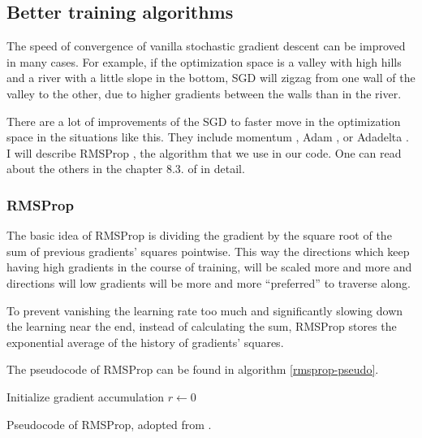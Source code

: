\subsection{Better training algorithms}
The speed of convergence of vanilla stochastic gradient descent can be improved in many cases. For example, if the optimization space is a valley with high hills and a river with a little slope in the bottom, SGD will zigzag from one wall of the valley to the other, due to higher gradients between the walls than in the river. 

There are a lot of improvements of the SGD to faster move in the optimization space in the situations like this. They include momentum \cite{momentum}, Adam \cite{adam}, or Adadelta \cite{adadelta}. I will describe RMSProp \cite{rmsprop}, the algorithm that we use in our code. One can read about the others in the chapter 8.3. of \cite{dlbook} in detail.

\subsubsection{RMSProp}\label{rmsprop-section}
The basic idea of RMSProp is dividing the gradient by the square root of the sum of previous gradients' squares pointwise. This way the directions which keep having high gradients in the course of training, will be scaled more and more and directions will low gradients will be more and more ``preferred'' to traverse along.

To prevent vanishing the learning rate too much and significantly slowing down the learning near the end, instead of calculating the sum, RMSProp stores the exponential average of the history of gradients' squares.

The pseudocode of RMSProp can be found in algorithm \ref{rmsprop-pseudo}.
\begin{algorithm}
  \DontPrintSemicolon
  Initialize gradient accumulation $r \leftarrow 0$\;
  \caption{Pseudocode of RMSProp, adopted from \cite{dlbook}.}\label{rmsprop-pseudo}
\end{algorithm}

